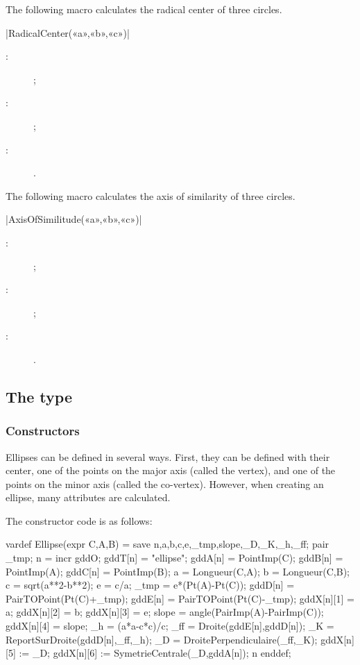 \documentclass[a4paper,english]{article}
\begin{document}
The following macro calculates the radical center of three circles.
\begin{colourband}
\macro|RadicalCenter(«a»,«b»,«c»)|
\begin{description}
  \item[:]   ;
  \item[:]   ;
  \item[:]  .
\end{description}
\end{colourband}
\bigskip

The following macro calculates the axis of similarity of three circles.
\begin{colourband}
\macro|AxisOfSimilitude(«a»,«b»,«c»)|
\begin{description}
  \item[:]   ;
  \item[:]   ;
  \item[:]  .
\end{description}
\end{colourband}
\bigskip

\subsection{The  type}
\subsubsection{Constructors}

Ellipses can be defined in several ways. First, they can be defined with their center, one of the points on the major axis (called the vertex), and one of the points on the minor axis (called the co-vertex). However, when creating an ellipse, many attributes are calculated.

The constructor code is as follows:
\begin{mpcode}
  vardef Ellipse(expr C,A,B) = 
  save n,a,b,c,e,_tmp,slope,_D,_K,_h,_ff; 
  pair _tmp;
  n = incr gddO;
  gddT[n] = "ellipse"; gddA[n] = PointImp(C); gddB[n] = PointImp(A);
  gddC[n] = PointImp(B);
  a = Longueur(C,A);
  b = Longueur(C,B);
  c = sqrt(a**2-b**2);
  e = c/a;
  _tmp = e*(Pt(A)-Pt(C));
  gddD[n] = PairTOPoint(Pt(C)+_tmp);
  gddE[n] = PairTOPoint(Pt(C)-_tmp);
  gddX[n][1] = a;
  gddX[n][2] = b;
  gddX[n][3] = e;
  slope = angle(PairImp(A)-PairImp(C));
  gddX[n][4] = slope;
  _h = (a*a-c*c)/c;
  _ff = Droite(gddE[n],gddD[n]);
  _K = ReportSurDroite(gddD[n],_ff,_h);
  _D = DroitePerpendiculaire(_ff,_K);
  gddX[n][5] := _D; %
  gddX[n][6] := SymetrieCentrale(_D,gddA[n]); %
  n
enddef;
\end{mpcode}
\end{document}
